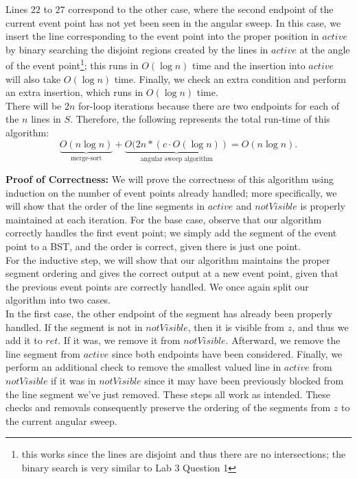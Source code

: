 \documentclass[11pt]{article}
\begin{document}
\begin{enumerate}
    Lines $22$ to $27$ correspond to the other case, where the second endpoint of the current event point has not yet been seen in the angular sweep. In this case, we insert the line corresponding to the event point into the proper position in $active$ by binary searching the disjoint regions created by the lines in $active$ at the angle of the event point\footnote{this works since the lines are disjoint and thus there are no intersections; the binary search is very similar to Lab 3 Question 1}; this runs in $O(\log n)$ time and the insertion into $active$ will also take $O(\log n)$ time. Finally, we check an extra condition and perform an extra insertion, which runs in $O(\log n)$ time.\\

    There will be $2n$ for-loop iterations because there are two endpoints for each of the $n$ lines in $S$. Therefore, the following represents the total run-time of this algorithm:
    \[\underbrace{O(n \log n)}_{\text{merge-sort}} + \underbrace{O(2n * (c \cdot O(\log n))}_{\text{angular sweep algorithm}} = O(n \log n).\]

    \textbf{Proof of Correctness:} We will prove the correctness of this algorithm using induction on the number of event points already handled; more specifically, we will show that the order of the line segments in $active$ and $notVisible$ is properly maintained at each iteration. For the base case, observe that our algorithm correctly handles the first event point; we simply add the segment of the event point to a BST, and the order is correct, given there is just one point. \\

    For the inductive step, we will show that our algorithm maintains the proper segment ordering and gives the correct output at a new event point, given that the previous event points are correctly handled. We once again split our algorithm into two cases. \\
    
    In the first case, the other endpoint of the segment has already been properly handled. If the segment is not in $notVisible$, then it is visible from $z$, and thus we add it to $ret$. If it was, we remove it from $notVisible$. Afterward, we remove the line segment from $active$ since both endpoints have been considered. Finally, we perform an additional check to remove the smallest valued line in $active$ from $notVisible$ if it was in $notVisible$ since it may have been previously blocked from the line segment we've just removed. These steps all work as intended. These checks and removals consequently preserve the ordering of the segments from $z$ to the current angular sweep.  \\


\end{enumerate}
\end{document}
